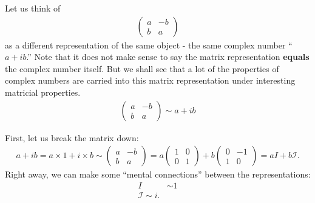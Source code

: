 \documentclass{book}
\theoremstyle{definition}
\begin{document}
Let us think of 
\begin{align*}
\begin{pmatrix}
a & -b\\
b & a
\end{pmatrix}
\end{align*}
as a different representation of the same object - the same complex number ``$a+ib$.'' Note that it does not make sense to say the matrix representation \textbf{equals} the complex number itself. But we shall see that a lot of the properties of complex numbers are carried into this matrix representation under interesting matricial properties.
\begin{align*}
\boxed{\begin{pmatrix}
	a & -b\\
	b & a
	\end{pmatrix}
\sim a + ib}
\end{align*}

First, let us break the matrix down:
\begin{align*}
a+ib = a\times 1 + i \times b \sim \begin{pmatrix}
a & -b \\
b & a
\end{pmatrix} 
= 
a\begin{pmatrix}
1 & 0\\
0 & 1
\end{pmatrix}
+
b\begin{pmatrix}
0 & -1\\
1 & 0
\end{pmatrix}
= aI + b\mathcal{I}.
\end{align*}
Right away, we can make some ``mental connections'' between the representations:
\begin{align*}
I &\sim 1\\
\mathcal{I} \sim i.
\end{align*}
\end{document}
